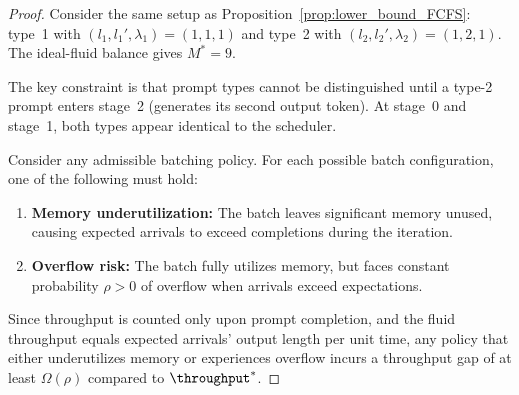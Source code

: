 \begin{proof}
Consider the same setup as Proposition~\ref{prop:lower_bound_FCFS}: type~1 with $(l_1, l_1', \lambda_1) = (1, 1, 1)$ and type~2 with $(l_2, l_2', \lambda_2) = (1, 2, 1)$. The ideal-fluid balance gives \(M^* = 9\).

The key constraint is that prompt types cannot be distinguished until a type-2 prompt enters stage~2 (generates its second output token). At stage~0 and stage~1, both types appear identical to the scheduler.

Consider any admissible batching policy. For each possible batch configuration, one of the following must hold:
\begin{enumerate}
\item \textbf{Memory underutilization:} The batch leaves significant memory unused, causing expected arrivals to exceed completions during the iteration.
\item \textbf{Overflow risk:} The batch fully utilizes memory, but faces constant probability $\rho > 0$ of overflow when arrivals exceed expectations.
\end{enumerate}

Since throughput is counted only upon prompt completion, and the fluid throughput equals expected arrivals' output length per unit time, any policy that either underutilizes memory or experiences overflow incurs a throughput gap of at least $\Omega(\rho)$ compared to $\throughput^*$.
\end{proof}












